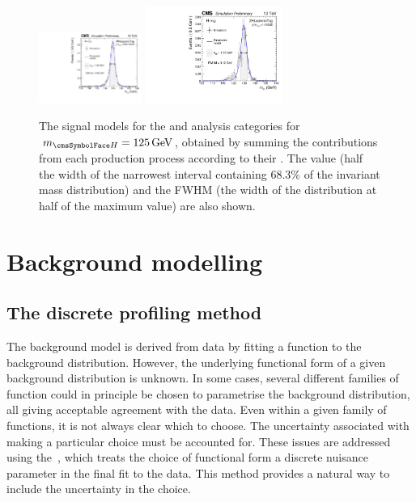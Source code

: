 \begin{figure}[ht!]
\includegraphics[width=0.3\textwidth]{modellingFigures/DCBpG/WHLeptonicTag.pdf} 
\includegraphics[width=0.4\textwidth]{modellingFigures/DCBpG/ZHLeptonicTag.pdf} 

\caption{The signal models for the \VBFTag and \TTHTag analysis categories for $\mH=125\GeV$, obtained by summing the contributions from each production process according to their \effxacc. The \effSigma value (half the width of the narrowest interval containing 68.3\% of the invariant mass distribution) and the FWHM (the width of the distribution at half of the maximum value) are also shown.}

\label{fig:model:sig_model_per_category_bis}
\end{figure}




\section{Background modelling}
\label{model:sec:background_model}
\subsection{The discrete profiling method}

The background model is derived from data by fitting a function to the background distribution. However, the underlying functional form of a given background distribution is unknown. In some cases, several different families of function could in principle be chosen to parametrise the background distribution, all giving acceptable agreement with the data. Even within a given family of functions, it is not always clear which to choose. The uncertainty associated with making a particular choice must be accounted for. %
These issues are addressed using the~\cite{DiscreteProfiling}, which treats the choice of functional form a discrete nuisance parameter in the final \NLL fit to the data. This method provides a natural way to include the uncertainty in the choice.

